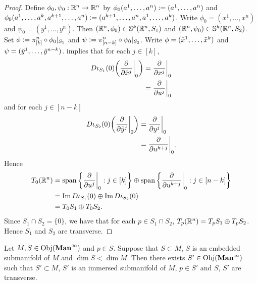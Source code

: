 \documentclass{book}
\begin{document}
	\begin{proof}
		Define $\phi_0, \psi_0: \mathbb{R}^n \rightarrow \mathbb{R}^n$ by $\phi_0(a^1, \ldots, a^n) \vcentcolon= (a^1, \ldots, a^n)$ and $\phi_0(a^1, \ldots, a^k, a^{k+1}, \ldots, a^n) \vcentcolon= (a^{k+1}, \ldots, a^n, a^1, \ldots, a^k)$. Write $\phi_0 = (x^1, \ldots, x^n)$ and $\psi_0 = (y^1, \ldots, y^n)$. Then $(\mathbb{R}^n, \phi_0) \in \mathbb{S}^k(\mathbb{R}^n, S_1)$ and $(\mathbb{R}^n, \psi_0) \in \mathbb{S}^k(\mathbb{R}^n, S_2)$. Set $\phi \vcentcolon= \pi^n_{[k]} \circ \phi_0|_{S_1}$ and $\psi \vcentcolon= \pi^n_{[n-k]} \circ \psi_0|_{S_2}$. Write $\phi = (\tilde{x}^1, \ldots, \tilde{x}^k)$ and $\psi = (\tilde{y}^1, \ldots, \tilde{y}^{n-k})$.  implies that for each $j \in [k]$,
		\begin{align*}
			D \iota_{S_1}(0) \bigg( \frac{\partial}{\partial \tilde{x}^j} \bigg|_0 \bigg) 
			& =  \frac{\partial}{\partial x^j} \bigg|_0 \\
			& = \frac{\partial}{\partial u^j} \bigg|_0 
		\end{align*}
		and for each $j \in [n-k]$
		\begin{align*}
			D \iota_{S_2}(0) \bigg( \frac{\partial}{\partial \tilde{y}^j} \bigg|_0 \bigg) 
			& =  \frac{\partial}{\partial y^j} \bigg|_0 \\
			& = \frac{\partial}{\partial u^{k+j}} \bigg|_0.
		\end{align*}
		Hence 
		\begin{align*}
			T_0(\mathbb{R}^n)
			& = \operatorname{span} \bigg \{  \frac{\partial}{\partial u^j} \bigg|_0  : j \in [k] \bigg \} \oplus \operatorname{span} \bigg \{  \frac{\partial}{\partial u^{k+j}} \bigg|_0  : j \in [n-k] \bigg \} \\
			& = \text{Im} \, D\iota_{S_1}(0) \oplus \text{Im} \, D\iota_{S_2}(0) \\
			& = T_0S_1 \oplus T_0S_2.
		\end{align*}
		Since $S_1 \cap S_2 = \{0\}$, we have that for each $p \in S_1 \cap S_2$, $T_p(\mathbb{R}^n) = T_pS_1 \oplus T_pS_2$. Hence $S_1$ and $S_2$ are transverse. 
	\end{proof}



	\begin{ex} 
		Let $M, S \in \operatorname{Obj}(\operatorname*{\text{\textbf{Man}}^{\infty}})$ and $p \in S$. Suppose that $S \subset M$, $S$ is an embedded submanifold of $M$ and $\dim S < \dim M$. Then there exists $S' \in \operatorname{Obj}(\operatorname*{\text{\textbf{Man}}^{\infty}})$ such that $S' \subset M$, $S'$ is an immersed submanifold of $M$, $p \in S'$ and $S$, $S'$ are transverse. 
	\end{ex}
\end{document}
